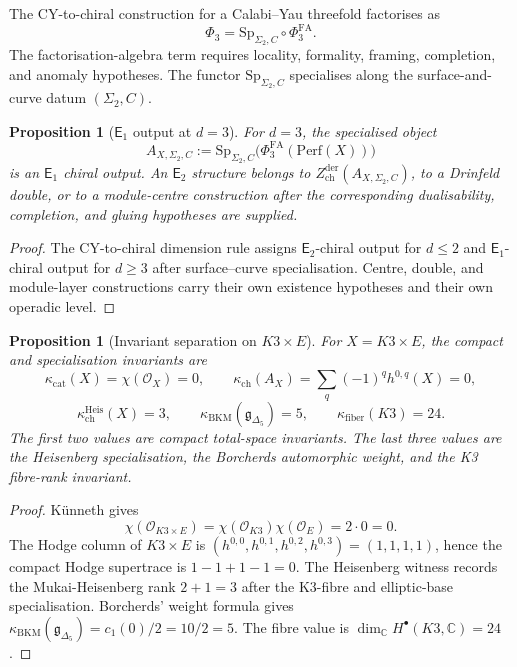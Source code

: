 \documentclass[11pt]{amsart}
\newtheorem{proposition}[theorem]{Proposition}
\theoremstyle{definition}
\theoremstyle{remark}
\providecommand{\Etwo}{\mathsf{E}_2}
\providecommand{\Eone}{\mathsf{E}_1}
\providecommand{\cO}{\mathcal{O}}
\providecommand{\CC}{\mathbb{C}}
\providecommand{\Perf}{\mathrm{Perf}}
\providecommand{\Sp}{\mathrm{Sp}}
\begin{document}
The CY-to-chiral construction for a Calabi--Yau threefold factorises as
\[
\Phi_3=\Sp_{\Sigma_2,C}\circ\Phi^{\mathrm{FA}}_3.
\]
The factorisation-algebra term requires locality, formality, framing,
completion, and anomaly hypotheses. The functor $\Sp_{\Sigma_2,C}$
specialises along the surface-and-curve datum $(\Sigma_2,C)$.

\begin{proposition}[$\Eone$ output at $d=3$]
\label{prop:d3-output-level}
For $d=3$, the specialised object
\[
A_{X,\Sigma_2,C}:=
\Sp_{\Sigma_2,C}\bigl(\Phi^{\mathrm{FA}}_3(\Perf(X))\bigr)
\]
is an $\Eone$ chiral output. An $\Etwo$ structure belongs to
$Z^{\mathrm{der}}_{\mathrm{ch}}(A_{X,\Sigma_2,C})$, to a Drinfeld
double, or to a module-centre construction after the corresponding
dualisability, completion, and gluing hypotheses are supplied.
\end{proposition}

\begin{proof}
The CY-to-chiral dimension rule assigns $\Etwo$-chiral output for
$d\leq2$ and $\Eone$-chiral output for $d\geq3$ after
surface--curve specialisation. Centre, double, and module-layer
constructions carry their own existence hypotheses and their own
operadic level.
\end{proof}

\begin{proposition}[Invariant separation on \texorpdfstring{$K3\times E$}{K3 x E}]
\label{prop:k3e-invariant-separation}
For $X=K3\times E$, the compact and specialisation invariants are
\[
\kappa_{\mathrm{cat}}(X)=\chi(\cO_X)=0,
\qquad
\kappa_{\mathrm{ch}}(A_X)=\sum_q(-1)^qh^{0,q}(X)=0,
\]
\[
\kappa_{\mathrm{ch}}^{\mathrm{Heis}}(X)=3,
\qquad
\kappa_{\mathrm{BKM}}(\mathfrak g_{\Delta_5})=5,
\qquad
\kappa_{\mathrm{fiber}}(K3)=24.
\]
The first two values are compact total-space invariants. The last three
values are the Heisenberg specialisation, the Borcherds automorphic
weight, and the K3 fibre-rank invariant.
\end{proposition}

\begin{proof}
K\"unneth gives
\[
\chi(\cO_{K3\times E})=\chi(\cO_{K3})\chi(\cO_E)=2\cdot0=0.
\]
The Hodge column of $K3\times E$ is
$(h^{0,0},h^{0,1},h^{0,2},h^{0,3})=(1,1,1,1)$, hence the compact
Hodge supertrace is $1-1+1-1=0$. The Heisenberg witness records the
Mukai-Heisenberg rank $2+1=3$ after the K3-fibre and elliptic-base
specialisation. Borcherds' weight formula gives
$\kappa_{\mathrm{BKM}}(\mathfrak g_{\Delta_5})=c_1(0)/2=10/2=5$.
The fibre value is $\dim_\CC H^\bullet(K3,\CC)=24$.
\end{proof}
\end{document}
